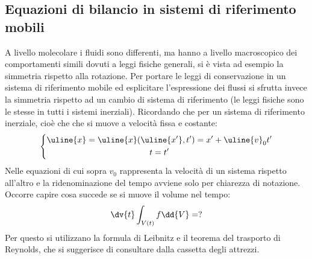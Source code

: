 \subsection{Equazioni di bilancio in sistemi di riferimento mobili}
A livello molecolare i fluidi sono differenti, ma hanno a livello macroscopico dei comportamenti simili dovuti a leggi fisiche generali, si è vista ad esempio la simmetria rispetto alla rotazione.
Per portare le leggi di conservazione in un sistema di riferimento mobile ed esplicitare l'espressione dei flussi si sfrutta invece la simmetria rispetto ad un cambio di sistema di riferimento (le leggi fisiche sono le stesse in tutti i sistemi inerziali).
Ricordando che per un sistema di riferimento inerziale, cioè che che si muove a velocità fissa e costante:
%
	\begin{equation*}
		\left\{ 
			\begin{gathered}
				\uline{x} = \uline{x} (\uline{x'}, t') = x' + \uline{v}_0 t'\\
				t = t'
			\end{gathered}
		\right.
	\end{equation*}
%
Nelle equazioni di cui sopra $v_0$ rappresenta la velocità di un sistema rispetto all'altro e la ridenominazione del tempo avviene solo per chiarezza di notazione.
Occorre capire cosa succede se si muove il volume nel tempo:
	\begin{equation*}
		\dv{t} \int_{V(t)} f \dd{V} = ?
	\end{equation*}
Per questo si utilizzano la formula di Leibnitz e il teorema del trasporto di Reynolds, che si suggerisce di consultare dalla cassetta degli attrezzi.

